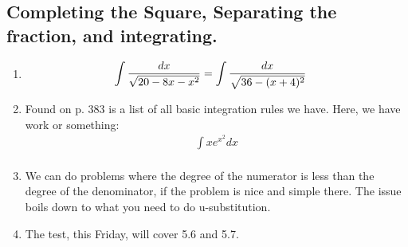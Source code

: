 \documentclass[11pt]{article}
\begin{document}
\subsection{Completing the Square, Separating the fraction, and integrating.}
	\begin{enumerate}
		\item
		\begin{align}
			\setcounter{equation}{0}
			\int \frac{dx}{\sqrt{20-8x-x^2}} &= \int \frac{dx}{\sqrt{36-(x+4)^2}}
		\end{align}
	\item Found on p. 383 is a list of all basic integration rules we have.  Here,
		we have work or something:
		\begin{align}
			\int xe^{x^2} dx \\
		\end{align}
	\item We can do problems where the degree of the numerator is less than the
		degree of the denominator, if the problem is nice and simple there.  The
		issue boils down to what you need to do u-substitution.
	\item The test, this Friday, will cover 5.6 and 5.7.
	\end{enumerate}
\end{document}
